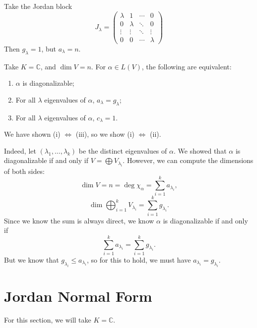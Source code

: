 \documentclass[12pt]{article}
\begin{document}
\begin{exbox}
	Take the Jordan block
	\[
	J_{\lambda} =
	\begin{pmatrix}
		 \lambda & 1 & \cdots & 0 \\
		 0 & \lambda & \ddots & 0 \\
		 \vdots & \vdots & \ddots & \vdots \\
		 0 & 0 & \cdots & \lambda
	\end{pmatrix}
	\]
	Then $g_{\lambda} = 1$, but $a_{\lambda} = n$.
\end{exbox}

\begin{lemma}
	Take $K = \mathbb{C}$, and $\dim V = n$. For $\alpha \in L(V)$, the following are equivalent:
	\begin{enumerate}[\normalfont(i)]
		\item $\alpha$ is diagonalizable;
		\item For all $\lambda$ eigenvalues of $\alpha$, $a_{\lambda} = g_{\lambda}$;
		\item For all $\lambda$ eigenvalues of $\alpha$, $c_{\lambda} = 1$.
	\end{enumerate}
\end{lemma}

\begin{proofbox}
	We have shown (i) $\iff$ (iii), so we show (i) $\iff$ (ii).

		Indeed, let $(\lambda_1, \ldots, \lambda_k)$ be the distinct eigenvalues of $\alpha$. We showed that $\alpha$ is diagonalizable if and only if $V = \bigoplus V_{\lambda_i}$. However, we can compute the dimensions of both sides:
		\[
		\dim V = n = \deg \chi_{\alpha} = \sum_{i = 1}^{k} a_{\lambda_i}
		,\]
		\[
		\dim \bigoplus_{i = 1}^{k} V_{\lambda_i} = \sum_{i = 1}^{k} g_{\lambda_i}
		.\]
		Since we know the sum is always direct, we know $\alpha$ is diagonalizable if and only if
		\[
		\sum_{i = 1}^{k}a_{\lambda_i} = \sum_{i = 1}^{k} g_{\lambda_i}
		.\]
		But we know that $g_{\lambda_i} \leq a_{\lambda_i}$, so for this to hold, we must have $a_{\lambda_i} = g_{\lambda_i}$.
\end{proofbox}

\newpage

\section{Jordan Normal Form}%
\label{sec:jordan_normal_form}

For this section, we will take $K = \mathbb{C}$.
\end{document}
